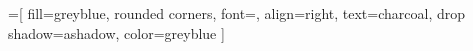 \newcommand{\denote}[1]{\left\llbracket#1\right\rrbracket}


\newcommand{\inputMinted}[2]{

}



\newlength{\dist}
\setlength{\dist}{1cm}

\newlength{\edge}
\setlength{\edge}{1.5cm}

\newlength{\longedge}
\setlength{\longedge}{1.7cm}

\setlength{\parindent}{0cm}

\newlength{\nd}
\setlength{\nd}{.6cm}

\newlength{\ndd}
\setlength{\ndd}{.5cm}

\newtheorem{sublemma}[theorem]{Sub-Lemma}
\let\oldexample\example
\renewcommand{\example}{\oldexample\normalfont}

\tikzset{>=latex,on grid, auto}

=[
  fill=greyblue,
  rounded corners,
  font=\small,
  align=right,
  text=charcoal,
  drop shadow={ashadow, color=greyblue}
]

\newcommand{\backEq}{\mathcal U^\equiv}
\newcommand{\backCC}{\mathcal U^\Subset}
\newcommand{\transEq}{\mathcal T^\equiv}
\newcommand{\transCC}{\mathcal T^\Subset}

\newcommand{\rcc}{{R^\Subset}}
\newcommand{\lcc}{L^\Subset}

